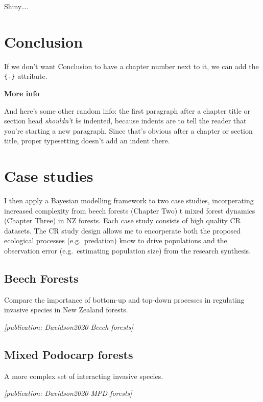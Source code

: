 Shiny\ldots.

\hypertarget{conclusion}{%
\chapter*{Conclusion}\label{conclusion}}

If we don't want Conclusion to have a chapter number next to it, we can add the \texttt{\{-\}} attribute.

\textbf{More info}

And here's some other random info: the first paragraph after a chapter title or section head \emph{shouldn't be} indented, because indents are to tell the reader that you're starting a new paragraph. Since that's obvious after a chapter or section title, proper typesetting doesn't add an indent there.

\hypertarget{case-studies}{%
\chapter{Case studies}\label{case-studies}}

I then apply a Bayesian modelling framework to two case studies, incorperating increased complexity from beech forests (Chapter Two) t mixed forest dynamics (Chapter Three) in NZ forests. Each case study consists of high quality CR datasets. The CR study design allows me to encorperate both the proposed ecological processes (e.g.~predation) know to drive populations and the observation error (e.g.~estimating population size) from the research synthesis.

\hypertarget{appbeech}{%
\section{Beech Forests}\label{appbeech}}

Compare the importance of bottom-up and top-down processes in regulating invasive species in New Zealand forests.

\emph{{[}publication: Davidson2020-Beech-forests{]}}

\hypertarget{app-mpd}{%
\section{Mixed Podocarp forests}\label{app-mpd}}

A more complex set of interacting invasive species.

\emph{{[}publication: Davidson2020-MPD-forests{]}}

